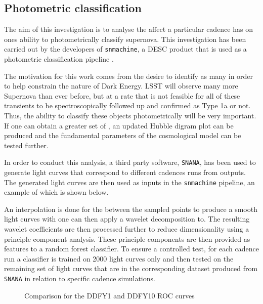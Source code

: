 \subsection{Photometric classification}


The aim of this investigation is to analyse the affect a particular cadence has
on ones ability to photometrically classify supernova. This investigation has been carried out by the
developers of {\tt snmachine}, a DESC product that is used as a photometric
classification pipeline \cite{lochner2016photometric}.

The motivation for this work comes from the desire to identify as many \sne in order to help constrain the nature of Dark Energy.
LSST will observe many more Supernova than ever before, but at a rate that is
not feasible for all of these transients to be spectroscopically followed up and
confirmed as Type 1a or not. Thus, the ability to classify these objects photometrically will be very
important. If one can obtain a greater set of \sne, an updated Hubble
digram plot can be produced and the fundamental parameters of the cosmological
model can be tested further.

In order to conduct this analysis, a third
party software, {\tt SNANA}, has been used to generate light curves that correspond to
different cadences runs from \opsim outputs. The generated light curves are
then used as inputs in the {\tt snmachine} pipeline, an example of which is
shown below.

An interpolation is done for the between the sampled points to produce a smooth
light curves with one can then apply a wavelet decomposition to. The resulting
wavelet coefficients are then processed further to reduce dimensionality using a
principle component analysis. These principle components are then
provided as features to a random forest classifier. To ensure a controlled test,
for each cadence run a classifier is trained on 2000 light
curves only and then tested on the remaining set of light curves that are in the
corresponding dataset produced from {\tt SNANA} in relation to specific \opsim cadence
simulations. 


\begin{figure}
  \centering
   \caption{Comparison for the DDFY1 and DDFY10 ROC curves}\label{fig:rocs}
\end{figure}

